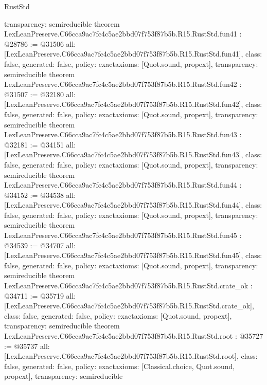 \begin{lexlean}{RustStd}
\begin{coremodule}
{  transparency: semireducible
}
theorem LexLeanPreserve.C66cca9ac7fc4c5ae2bbd07f753f87b5b.R15.RustStd.fun41 : @28786 := @31506 {
  all: [LexLeanPreserve.C66cca9ac7fc4c5ae2bbd07f753f87b5b.R15.RustStd.fun41],
  class: false,
  generated: false,
  policy: exact{axioms: [Quot.sound, propext]},
  transparency: semireducible
}
theorem LexLeanPreserve.C66cca9ac7fc4c5ae2bbd07f753f87b5b.R15.RustStd.fun42 : @31507 := @32180 {
  all: [LexLeanPreserve.C66cca9ac7fc4c5ae2bbd07f753f87b5b.R15.RustStd.fun42],
  class: false,
  generated: false,
  policy: exact{axioms: [Quot.sound, propext]},
  transparency: semireducible
}
theorem LexLeanPreserve.C66cca9ac7fc4c5ae2bbd07f753f87b5b.R15.RustStd.fun43 : @32181 := @34151 {
  all: [LexLeanPreserve.C66cca9ac7fc4c5ae2bbd07f753f87b5b.R15.RustStd.fun43],
  class: false,
  generated: false,
  policy: exact{axioms: [Quot.sound, propext]},
  transparency: semireducible
}
theorem LexLeanPreserve.C66cca9ac7fc4c5ae2bbd07f753f87b5b.R15.RustStd.fun44 : @34152 := @34538 {
  all: [LexLeanPreserve.C66cca9ac7fc4c5ae2bbd07f753f87b5b.R15.RustStd.fun44],
  class: false,
  generated: false,
  policy: exact{axioms: [Quot.sound, propext]},
  transparency: semireducible
}
theorem LexLeanPreserve.C66cca9ac7fc4c5ae2bbd07f753f87b5b.R15.RustStd.fun45 : @34539 := @34707 {
  all: [LexLeanPreserve.C66cca9ac7fc4c5ae2bbd07f753f87b5b.R15.RustStd.fun45],
  class: false,
  generated: false,
  policy: exact{axioms: [Quot.sound, propext]},
  transparency: semireducible
}
theorem LexLeanPreserve.C66cca9ac7fc4c5ae2bbd07f753f87b5b.R15.RustStd.crate_ok : @34711 := @35719 {
  all: [LexLeanPreserve.C66cca9ac7fc4c5ae2bbd07f753f87b5b.R15.RustStd.crate_ok],
  class: false,
  generated: false,
  policy: exact{axioms: [Quot.sound, propext]},
  transparency: semireducible
}
theorem LexLeanPreserve.C66cca9ac7fc4c5ae2bbd07f753f87b5b.R15.RustStd.root : @35727 := @35737 {
  all: [LexLeanPreserve.C66cca9ac7fc4c5ae2bbd07f753f87b5b.R15.RustStd.root],
  class: false,
  generated: false,
  policy: exact{axioms: [Classical.choice, Quot.sound, propext]},
  transparency: semireducible
}


\end{coremodule}
\end{lexlean}
